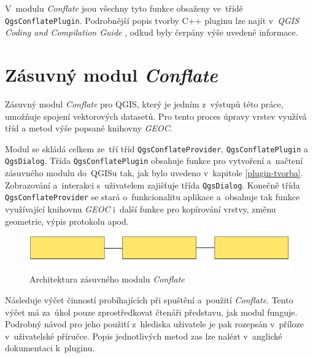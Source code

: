 V~modulu \textit{Conflate} jsou všechny tyto funkce obsaženy ve~třídě
\texttt{QgsConflatePlugin}. 
Podrobnější popis tvorby C++ pluginu lze najít v~\textit{QGIS Coding and 
Compilation Guide} %
, odkud byly čerpány výše uvedené informace.




\section{Zásuvný modul \textit{Conflate}}
\label{plugin-navrh}

Zásuvný modul \textit{Conflate} pro QGIS, který je jedním z~výstupů této práce,
umožňuje spojení vektorových datasetů. Pro tento proces úpravy vrstev využívá
tříd a metod výše popsané knihovny \textit{GEOC}.

Modul se skládá celkem ze~tří tříd \texttt{QgsConflateProvider}, 
\texttt{QgsConflatePlugin} a~ \texttt{QgsDialog}. Třída \texttt{QgsConflatePlugin} 
obsahuje funkce pro vytvoření a~načtení zásuvného modulu do~QGISu tak, jak bylo 
uvedeno v~kapitole \ref{plugin-tvorba}. Zobrazování a~interakci s~uživatelem 
zajišťuje třída \texttt{QgsDialog}. Konečně třída \texttt{QgsConflateProvider} 
se stará o~funkcionalitu aplikace a~obsahuje tak funkce využívající knihovnu 
\textit{GEOC} i~další funkce pro kopírování vrstvy, změnu geometrie, výpis 
protokolu apod.

\vspace{0.5cm}
\label{schema}
  \begin{figure}[hbt]
    \centering
      \includegraphics[width=350pt]{./pictures/schema.pdf}
      \caption{Architektura zásuvného modulu \textit{Conflate}}
      \label{fig:schema}
  \end{figure} 


Následuje výčet činností probíhajících při spuštění a~použití \textit{Conflate}.
Tento výčet má za~úkol pouze zprostředkovat čtenáři představu, jak modul funguje.
Podrobný návod pro jeho použití z~hlediska uživatele je pak rozepsán v~příloze
v~uživatelské příručce. Popis jednotlivých metod zas lze nalézt v~anglické
dokumentaci k~pluginu. %

